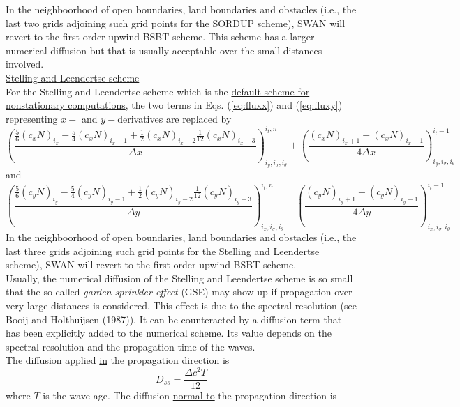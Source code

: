 \documentclass[12pt]{book}
\begin{document}
In the neighboorhood of open boundaries, land boundaries and obstacles (i.e., the last two grids adjoining such grid points for
the SORDUP scheme), SWAN will revert to the first order upwind BSBT scheme. This scheme has a larger numerical diffusion but that
is usually acceptable over the small distances involved.
\\[2ex]
\noindent
\underline{Stelling and Leendertse scheme}
\\[2ex]
\noindent
For the Stelling and Leendertse scheme which is the \underline{default scheme for nonstationary computations}, the two terms in
Eqs. (\ref{eq:fluxx}) and (\ref{eq:fluxy}) representing $x-$ and $y-$derivatives are replaced by
\begin{equation}
  \left( \frac{\frac{5}{6} (c_x N)_{i_x} - \frac{5}{4} (c_x N)_{i_x-1} + \frac{1}{2} (c_x N)_{i_x-2} \frac{1}{12} (c_x N)_{i_x-3}}{\Delta x} \right)^{i_t,n}_{i_y, i_{\sigma}, i_{\theta}}
  + \left( \frac{(c_x N)_{i_x+1} - (c_x N)_{i_x-1}}{4 \Delta x} \right)^{i_t-1}_{i_y, i_{\sigma}, i_{\theta}}
\end{equation}
and
\begin{equation}
  \left( \frac{\frac{5}{6} (c_y N)_{i_y} - \frac{5}{4} (c_y N)_{i_y-1} + \frac{1}{2} (c_y N)_{i_y-2} \frac{1}{12} (c_y N)_{i_y-3}}{\Delta y} \right)^{i_t,n}_{i_x, i_{\sigma}, i_{\theta}}
  + \left( \frac{(c_y N)_{i_y+1} - (c_y N)_{i_y-1}}{4 \Delta y} \right)^{i_t-1}_{i_x, i_{\sigma}, i_{\theta}}
\end{equation}
In the neighboorhood of open boundaries, land boundaries and obstacles (i.e., the last three grids adjoining such grid points for
the Stelling and Leendertse scheme), SWAN will revert to the first order upwind BSBT scheme.
\\[2ex]
\noindent
Usually, the numerical diffusion of the Stelling and Leendertse scheme is so small that the so-called {\it garden-sprinkler effect} (GSE) may show up if propagation
over very large distances is considered. This effect is due to the spectral resolution (see Booij and Holthuijsen (1987)). It can be counteracted by a diffusion term
that has been explicitly added to the numerical scheme. Its value depends on the spectral resolution and the propagation time of the waves.
\\[2ex]
\noindent
The diffusion applied \underline{in} the propagation direction is
\begin{equation}
  D_{ss} = \frac{\Delta c^2T}{12}
\end{equation}
where $T$ is the wave age. The diffusion \underline{normal to} the propagation direction is
\end{document}
